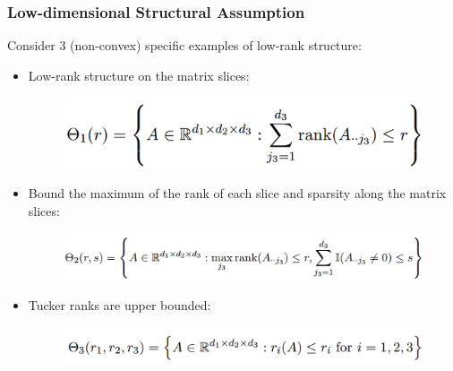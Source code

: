 \documentclass{beamer}
\begin{document}
	
	\begin{frame}
		\frametitle{Low-dimensional Structural Assumption}
		Consider 3 (non-convex) specific examples of low-rank structure:
		\begin{itemize}
			\item 
			Low-rank structure on the matrix slices:
			 \begin{figure}
				\includegraphics[width=.6\linewidth]{image004.png}
			\end{figure}
			\item
			Bound the maximum of the rank of each slice and sparsity along the matrix slices:
			 \begin{figure}
				\includegraphics[width=.8\linewidth]{image005.png}
			\end{figure}
			\item
			Tucker ranks are upper bounded:
			 \begin{figure}
				\includegraphics[width=.7\linewidth]{image006.png}
			\end{figure}
		\end{itemize}
	\end{frame}
	
\end{document}
